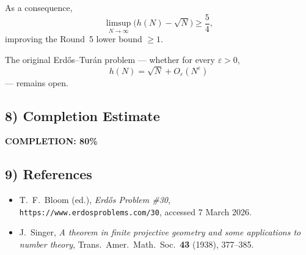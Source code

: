 As a consequence,
\[
\limsup_{N\to\infty}\bigl(h(N)-\sqrt N\bigr)\ge \frac54,
\]
improving the Round~5 lower bound $\ge 1$.

The original Erd\H{o}s--Tur\'an problem --- whether for every $\varepsilon>0$,
\[
h(N)=\sqrt N+O_\varepsilon(N^\varepsilon)
\]
--- remains open.

\subsection{8) Completion Estimate}
\textbf{COMPLETION: 80\%}

\subsection{9) References}
\begin{itemize}
\item T.\ F.\ Bloom (ed.), \emph{Erd\H{o}s Problem \#30}, \texttt{https://www.erdosproblems.com/30}, accessed 7 March 2026.
\item J.\ Singer, \emph{A theorem in finite projective geometry and some applications to number theory}, Trans.\ Amer.\ Math.\ Soc.\ \textbf{43} (1938), 377--385.
\end{itemize}
